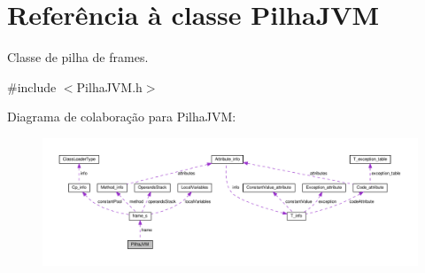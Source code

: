 \hypertarget{classPilhaJVM}{}\section{Referência à classe Pilha\+J\+VM}
\label{classPilhaJVM}


Classe de pilha de frames.  




{\ttfamily \#include $<$Pilha\+J\+V\+M.\+h$>$}



Diagrama de colaboração para Pilha\+J\+VM\+:
\nopagebreak
\begin{figure}[H]
\begin{center}
\leavevmode
\includegraphics[width=350pt]{classPilhaJVM__coll__graph}
\end{center}
\end{figure}
